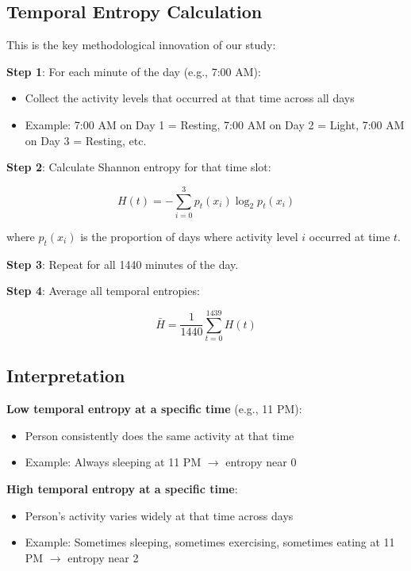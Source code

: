 \documentclass[12pt]{article}
\begin{document}
\subsection{Temporal Entropy Calculation}

This is the key methodological innovation of our study:

\textbf{Step 1}: For each minute of the day (e.g., 7:00 AM):
\begin{itemize}
    \item Collect the activity levels that occurred at that time across all days
    \item Example: 7:00 AM on Day 1 = Resting, 7:00 AM on Day 2 = Light, 7:00 AM on Day 3 = Resting, etc.
\end{itemize}

\textbf{Step 2}: Calculate Shannon entropy for that time slot:

\begin{equation}
H(t) = -\sum_{i=0}^{3} p_t(x_i) \log_2 p_t(x_i)
\end{equation}

where $p_t(x_i)$ is the proportion of days where activity level $i$ occurred at time $t$.

\textbf{Step 3}: Repeat for all 1440 minutes of the day.

\textbf{Step 4}: Average all temporal entropies:

\begin{equation}
\bar{H} = \frac{1}{1440}\sum_{t=0}^{1439} H(t)
\end{equation}

\subsection{Interpretation}

\textbf{Low temporal entropy at a specific time} (e.g., 11 PM):
\begin{itemize}
    \item Person consistently does the same activity at that time
    \item Example: Always sleeping at 11 PM $\rightarrow$ entropy near 0
\end{itemize}

\textbf{High temporal entropy at a specific time}:
\begin{itemize}
    \item Person's activity varies widely at that time across days
    \item Example: Sometimes sleeping, sometimes exercising, sometimes eating at 11 PM $\rightarrow$ entropy near 2
\end{itemize}
\end{document}
